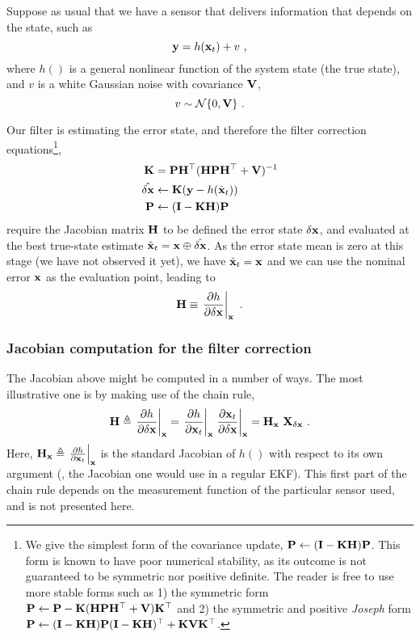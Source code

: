 Suppose as usual that we have a sensor that delivers information that depends on the state, such as
%
\begin{equation}
{\bf y} = h({\bf x}_t) + v~,
\end{equation}
%
where $h()$ is a general nonlinear function of the system state (the true state), and $v$ is a white Gaussian noise with covariance ${\bf V}$,
%
\begin{equation}
v\sim\mathcal{N}\{0,{\bf V}\}~.
\end{equation}

Our filter is estimating the error state, and therefore the filter correction equations\footnote{We give the simplest form of the covariance update, ${\bf P} \gets
 ({\bf I}-{\bf K}{\bf H}){\bf P}$. 
 This form is known to have poor numerical stability, as its outcome is not guaranteed to be symmetric nor positive definite. 
 The reader is free to use more stable forms such as 1) the symmetric form ${\bf P}\gets{\bf P}-{\bf K}({\bf H}{\bf P}{\bf H}^{\top}+{\bf V}){\bf K}^{\top}$ and 2) the symmetric and positive \emph{Joseph} form ${\bf P} \gets ({\bf I}-{\bf K}{\bf H}){\bf P}({\bf I}-{\bf K}{\bf H})^{\top}+{\bf K}{\bf V}{\bf K}^{\top}$.}, 
%
%
\begin{align}
{\bf K} &= {\bf P}{\bf H}^{\top}({\bf H}{\bf P}{\bf H}^{\top}+{\bf V})^{-1} \\
\hat{\delta{\bf x}} &\gets {\bf K}({\bf y}-h(\hat{{\bf x}}_t)) \\
{\bf P} &\gets ({\bf I}-{\bf K}{\bf H}){\bf P}
\end{align}%
%
require the Jacobian matrix ${\bf H}$ to be defined \wrt the error state $\delta{\bf x}$, and evaluated at the best true-state estimate $\hat{{\bf x}}_t={\bf x}\oplus\hat{\delta{\bf x}}$. 
As the error state mean is zero at this stage (we have not observed it yet), we have $\hat{{\bf x}}_t = {\bf x}$ and we can use the nominal error ${\bf x}$ as the evaluation point, leading to
%
\begin{equation}
{\bf H} \equiv \left.\frac{\partial h}{\partial\delta{\bf x}}\right|_{{\bf x}}~.
\end{equation}

\subsubsection{Jacobian computation for the filter correction}

The Jacobian above might be computed in a number of ways. 
The most illustrative one is by making use of the chain rule, 
%
\begin{equation}
\bfH \triangleq \pjac{h}{\delta\bfx}{\bfx} 
= \pjac{h}{\bfx_t}{\bfx}\pjac{\bfx_t}{\delta\bfx}{\bfx} = \bfH_\bfx\ \bfX_{\delta\bfx}~.
\end{equation}
%
Here, ${\bf H}_{\bf x}\triangleq\left.\frac{\partial h}{\partial{\bf x}_t}\right|_{{\bf x}}$ is the standard Jacobian of $h()$ with respect to its own argument (\ie, the Jacobian one would use in a regular EKF). 
This first part of the chain rule depends on the measurement function of the particular sensor used, and is not presented here. 

